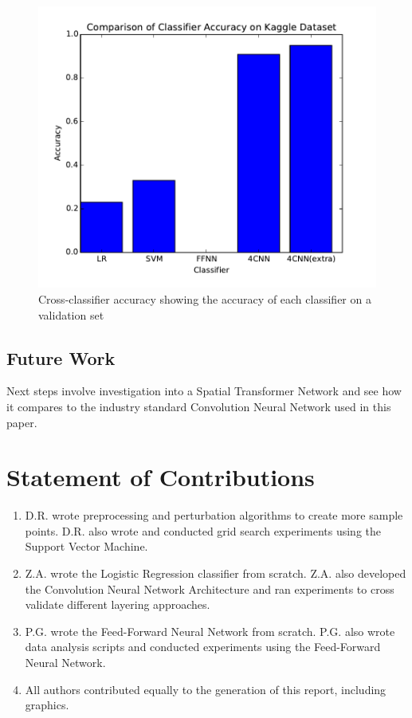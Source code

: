 \documentclass[conference]{IEEEtran}
\begin{document}
\begin{figure}[h]
	\label{crossacc}
	\centering
	\includegraphics[scale=0.6]{cross-classifier-acc.pdf}
	\caption{Cross-classifier accuracy showing the accuracy of each classifier on a validation set}
\end{figure}


\subsection{Future Work}
Next steps involve investigation into a Spatial Transformer Network \cite{STN} and see how it compares to the industry standard Convolution Neural Network used in this paper.


\section{Statement of Contributions}

\begin{enumerate}
\item D.R. wrote preprocessing and perturbation algorithms to create more sample points. D.R. also wrote and conducted grid search experiments using the Support Vector Machine.
\item Z.A. wrote the Logistic Regression classifier from scratch. Z.A. also developed the Convolution Neural Network Architecture and ran experiments to cross validate different layering approaches.
\item P.G. wrote the Feed-Forward Neural Network from scratch. P.G. also wrote data analysis scripts and conducted experiments using the Feed-Forward Neural Network.
\item All authors contributed equally to the generation of this report, including graphics.
\end{enumerate}
\end{document}
